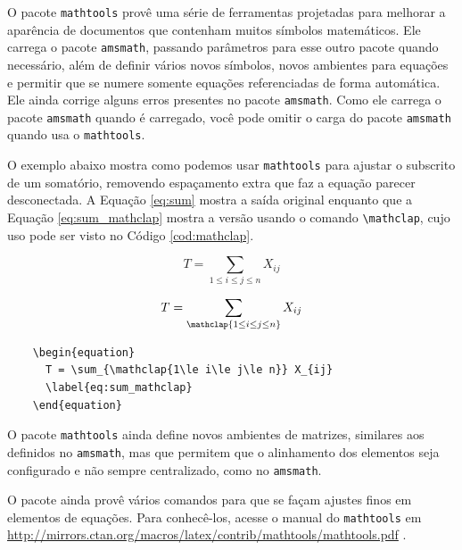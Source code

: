 O pacote \texttt{mathtools} provê uma série de ferramentas projetadas para melhorar a aparência de documentos que contenham muitos símbolos matemáticos. Ele carrega o pacote \texttt{amsmath}, passando parâmetros para esse outro pacote quando necessário, além de definir vários novos símbolos, novos ambientes para equações e permitir que se numere somente equações referenciadas de forma automática. Ele ainda corrige alguns erros presentes no pacote \texttt{amsmath}. Como ele carrega o pacote \texttt{amsmath} quando é carregado, você pode omitir o carga do pacote \texttt{amsmath} quando usa o \texttt{mathtools}.

O exemplo abaixo mostra como podemos usar \texttt{mathtools} para ajustar o subscrito de um somatório, removendo espaçamento extra que faz a equação parecer desconectada. A Equação \ref{eq:sum} mostra a saída original enquanto que a Equação \ref{eq:sum_mathclap} mostra a versão usando o comando \texttt{\textbackslash mathclap}, cujo uso pode ser visto no Código \ref{cod:mathclap}.

\begin{equation}
	 T = \sum_{1\le i\le j\le n} X_{ij}
	 \label{eq:sum}
\end{equation}

\begin{equation}
	T = \sum_{\mathclap{1\le i\le j\le n}} X_{ij}
	\label{eq:sum_mathclap}
\end{equation}

\begin{listing}[ht]
	\begin{verbatim}
	\begin{equation}
	  T = \sum_{\mathclap{1\le i\le j\le n}} X_{ij}
	  \label{eq:sum_mathclap}
	\end{equation}
	\end{verbatim} 
	\caption{Exemplo do uso do comando \textbackslash \texttt{mathclap}.}
	\label{cod:mathclap}
\end{listing}

O pacote \texttt{mathtools} ainda define novos ambientes de matrizes, similares aos definidos no \texttt{amsmath}, mas que permitem que o alinhamento dos elementos seja configurado e não sempre centralizado, como no \texttt{amsmath}. 

O pacote ainda provê vários comandos para que se façam ajustes finos em elementos de equações. Para conhecê-los, acesse o manual do \texttt{mathtools} em 
\url{http://mirrors.ctan.org/macros/latex/contrib/mathtools/mathtools.pdf} \parencite{mathtools}.

